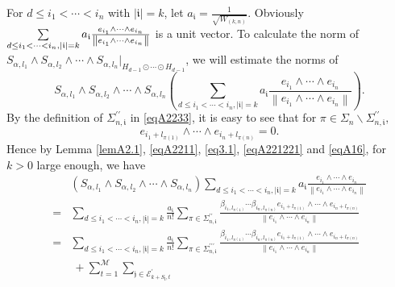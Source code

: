 \documentclass[11pt]{article}
\theoremstyle{plain}
\theoremstyle{definition}
\begin{document}
{		For $d \leq i_1 < \cdots < i_n$ with $|\mathfrak{i}|=k$, let $a_{\mathfrak{i}}=\frac{1}{\sqrt{W_{(k,n)}} }$. Obviously $\sum\limits\limits_{d \leq i_1 < \cdots < i_n, |\mathfrak{i}|=k} a_{\mathfrak{i}} \frac{ e_{i_1} \wedge \cdots \wedge e_{i_n} }{\left \|  e_{i_1} \wedge \cdots \wedge e_{i_n}  \right \| }$ is a unit vector.
		To calculate the norm of $S_{{\alpha,l_{1}}}\wedge S_{{\alpha,l_{2}}}\wedge \cdots \wedge S_{{\alpha,l_{n}}}|_{H_{d-1}\odot \cdots \odot H_{d-1}}$, we will estimate the norms of $$S_{{\alpha,l_{1}}}\wedge S_{{\alpha,l_{2}}}\wedge \cdots \wedge S_{{\alpha,l_{n}}}\left(\sum\limits_{d \leq i_1 < \cdots < i_n, |\mathfrak{i}|=k}a_{\mathfrak{i}} \frac{ e_{i_1} \wedge \cdots \wedge e_{i_n} }{\left \|  e_{i_1} \wedge \cdots \wedge e_{i_n}  \right \| }\right).$$ 
		By the definition of $\Sigma_{n,\mathfrak{i}}^{\prime \prime}$ in \eqref{eqA2233}, it is easy to see that
			for $\pi \in \Sigma_{n}\backslash \Sigma_{n,\mathfrak{i}}^{\prime \prime},$ 
 $$ e_{i_1+l_{\pi(1)}} \wedge \cdots \wedge e_{i_n+l_{\pi(n)}}=0.$$ Hence by Lemma \ref{lemA2.1},  \eqref{eqA2211}, \eqref{eq3.1}, \eqref{eqA221221} and \eqref{eqA16}, for $k>0$ large enough, we have
\begin{equation}\label{eq324}
			\begin{aligned}
				&	\left (S_{{\alpha,l_{1}}}\wedge S_{{\alpha,l_{2}}}\wedge \cdots \wedge S_{{\alpha,l_{n}}} \right )
				\sum\limits_{d \leq i_1 < \cdots < i_n, |\mathfrak{i}|=k}a_{\mathfrak{i}} \frac{ e_{i_1} \wedge \cdots \wedge e_{i_n} }{\left \|  e_{i_1} \wedge \cdots \wedge e_{i_n}  \right \| }
				\\ =& \sum\limits_{d \leq i_1 < \cdots < i_n, |\mathfrak{i}|=k}\frac{a_{{\mathfrak{i}}}}{n!}\sum\limits_{\pi  \in \Sigma_{n,\mathfrak{i}}^{\prime \prime} }\frac{ \beta_{i_{1},l_{\pi  (1)}} \cdots\beta_{i_{n},l_{\pi  (n)}}e_{i_1+l_{\pi(1)}} \wedge \cdots \wedge e_{i_n+l_{\pi(n)}}}{\left \|  e_{i_1} \wedge \cdots \wedge e_{i_n}  \right \| }
				\\=&
\sum\limits_{d \leq i_1 < \cdots < i_n, |\mathfrak{i}|=k}\frac{a_{{\mathfrak{i}}}}{n!}\sum\limits_{\pi  \in \Sigma_{n,\mathfrak{i}}^{\prime \prime\prime} }\frac{ \beta_{i_{1},l_{\pi  (1)}} \cdots\beta_{i_{n},l_{\pi  (n)}}e_{i_1+l_{\pi(1)}} \wedge \cdots \wedge e_{i_n+l_{\pi(n)}}}{\left \|  e_{i_1} \wedge \cdots \wedge e_{i_n}  \right \| }
\\  & ~ +\sum\limits_{t=1}^{\mathscr{M}}\sum\limits_{ \mathfrak{j} \in \mathcal{E}_{k+S_{\mathfrak{l}},t}^{\prime} }

\end{aligned}
\end{equation}}
\end{document}
